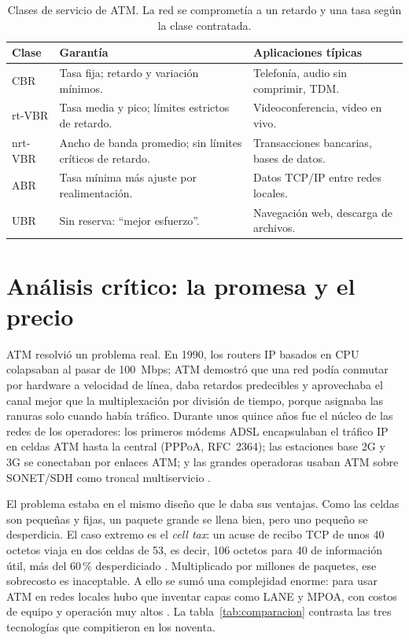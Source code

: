\documentclass[12pt,a4paper]{article}
\begin{document}
\begin{table}[h]
    \centering
    \small
    \begin{tabularx}{\textwidth}{l X X}
        \toprule
        \textbf{Clase} & \textbf{Garantía} & \textbf{Aplicaciones típicas} \\
        \midrule
        CBR & Tasa fija; retardo y variación mínimos. & Telefonía, audio sin comprimir, TDM. \\
        rt-VBR & Tasa media y pico; límites estrictos de retardo. & Videoconferencia, video en vivo. \\
        nrt-VBR & Ancho de banda promedio; sin límites críticos de retardo. & Transacciones bancarias, bases de datos. \\
        ABR & Tasa mínima más ajuste por realimentación. & Datos TCP/IP entre redes locales. \\
        UBR & Sin reserva: ``mejor esfuerzo''. & Navegación web, descarga de archivos. \\
        \bottomrule
    \end{tabularx}
    \caption{Clases de servicio de ATM. La red se comprometía a un retardo y una tasa según la clase contratada.}
    \label{tab:qos}
\end{table}

\section{Análisis crítico: la promesa y el precio}

ATM resolvió un problema real. En 1990, los routers IP basados en CPU colapsaban al pasar de 100~Mbps; ATM demostró que una red podía conmutar por hardware a velocidad de línea, daba retardos predecibles y aprovechaba el canal mejor que la multiplexación por división de tiempo, porque asignaba las ranuras solo cuando había tráfico. Durante unos quince años fue el núcleo de las redes de los operadores: los primeros módems ADSL encapsulaban el tráfico IP en celdas ATM hasta la central (PPPoA, RFC~2364); las estaciones base 2G y 3G se conectaban por enlaces ATM; y las grandes operadoras usaban ATM sobre SONET/SDH como troncal multiservicio \cite{heinanen1999, deprycker1995}.

El problema estaba en el mismo diseño que le daba sus ventajas. Como las celdas son pequeñas y fijas, un paquete grande se llena bien, pero uno pequeño se desperdicia. El caso extremo es el \emph{cell tax}: un acuse de recibo TCP de unos 40 octetos viaja en dos celdas de 53, es decir, 106 octetos para 40 de información útil, más del 60\,\% desperdiciado \cite{chao2001}. Multiplicado por millones de paquetes, ese sobrecosto es inaceptable. A ello se sumó una complejidad enorme: para usar ATM en redes locales hubo que inventar capas como LANE y MPOA, con costos de equipo y operación muy altos \cite{deprycker1995}. La tabla~\ref{tab:comparacion} contrasta las tres tecnologías que compitieron en los noventa.
\end{document}
